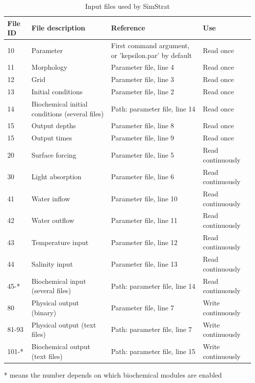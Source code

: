 \documentclass[paper=a4, fontsize=12pt]{article}
\begin{document}
\begin{table}[h!]
	\caption{Input files used by SimStrat}
	\label{inputfiles}
	\begin{tabularx}{\textwidth}{lXXl}\toprule
		\textbf{File ID} & \textbf{File description} & \textbf{Reference} & \textbf{Use} \\
		\midrule
		10 & Parameter & First command argument, or 'kepsilon.par' by default & Read once \\
		11 & Morphology & Parameter file, line 4 & Read once \\
		12 & Grid & Parameter file, line 3 & Read once \\
		13 & Initial conditions & Parameter file, line 2 & Read once \\
		14 & Biochemical initial conditions (several files) & Path: parameter file, line 14 & Read once \\
		15 & Output depths & Parameter file, line 8 & Read once \\
		15 & Output times & Parameter file, line 9 & Read once \\
		20 & Surface forcing & Parameter file, line 5 & Read continuously \\
		30 & Light absorption & Parameter file, line 6 & Read continuously \\
		41 & Water inflow & Parameter file, line 10 & Read continuously \\
		42 & Water outflow & Parameter file, line 11 & Read continuously \\
		43 & Temperature input & Parameter file, line 12 & Read continuously \\
		44 & Salinity input & Parameter file, line 13 & Read continuously \\
		45-* & Biochemical input (several files) & Path: parameter file, line 14 & Read continuously \\
		80 & Physical output (binary) & Parameter file, line 7 & Write  continuously \\
		81-93 & Physical output (text files) & Path: parameter file, line 7 & Write  continuously \\
		101-* & Biochemical output (text files) & Path: parameter file, line 15 & Write  continuously \\
		\bottomrule
	\end{tabularx}\vspace{0.3em}
	* means the number depends on which biochemical modules are enabled
\end{table}
\end{document}
